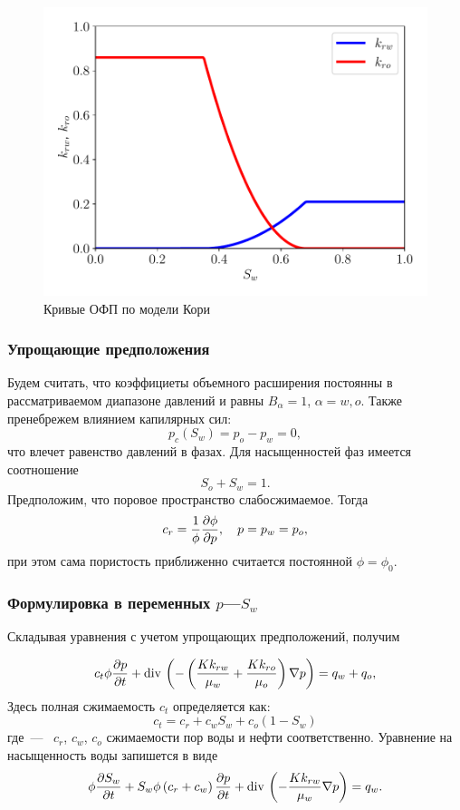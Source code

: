 \begin{figure}[H]
	\centering
	\includegraphics[width=0.7\linewidth]{img/RPP_Corey}
	\caption{Кривые ОФП по модели Кори}
	\label{fig:RPP_Corey}
\end{figure}

\subsubsection{Упрощающие предположения}
Будем считать, что коэффициеты объемного расширения постоянны в рассматриваемом диапазоне давлений и равны $B_\alpha = 1$, $\alpha = w,o$. Также пренебрежем влиянием капилярных сил:
\begin{equation}\label{eq:common_eq_capillar}
	p_c(S_w) = p_o - p_w = 0,
\end{equation}
что влечет равенство давлений в фазах.
Для насыщенностей фаз имеется соотношение
\begin{equation}\label{eq:So_Sw_1}
	S_o + S_w = 1.
\end{equation}
Предположим, что поровое пространство слабосжимаемое. Тогда
\begin{equation}\label{eq:compress_phi}
	c_r = \frac{1}{\phi} \dfrac{\partial \phi}{\partial p}, \quad p = p_w=p_o,
\end{equation}
при этом сама пористость приближенно считается постоянной $\phi=\phi_0$.

\subsubsection{Формулировка в переменных $p$---$S_w$}

Складывая уравнения с учетом упрощающих предположений, получим

\begin{equation}
    c_t\phi \dfrac{\partial p}{\partial t}
    + \operatorname{div}\, \left( -\left(\frac{K k_{rw}}{\mu_w } +
     \frac{K k_{ro}}{\mu_o}\right)\nabla p \right) = q_w + q_o,
\end{equation}
Здесь полная сжимаемость $c_t$ определяется как:
\begin{equation}\label{eq:totalCompress}
	c_t= c_r + c_w  S_w + c_o (1-S_w)
\end{equation}
где~---~ $c_r$, $c_w$, $c_o$ сжимаемости пор  воды и нефти соответственно.
Уравнение на насыщенность воды запишется в виде
\begin{equation}\label{eq:star_common_equation_multiphase_satur}
	  \phi \dfrac{\partial S_w}{\partial t} + S_w\phi\left(c_r + c_w \right)\dfrac{\partial p}{\partial t} + \operatorname{div}\, \left( -\frac{K k_{rw}}{\mu_w}\nabla p \right) = 
	  q_w.
\end{equation}

